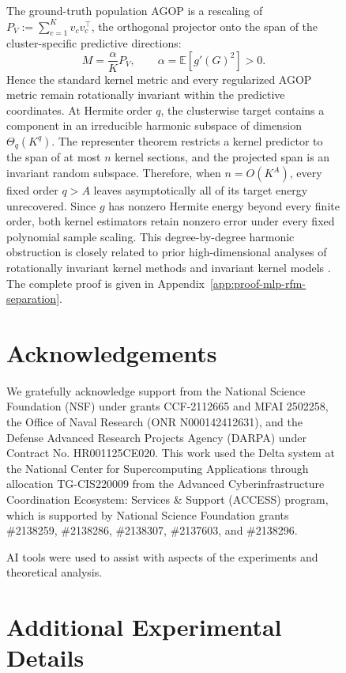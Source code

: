 \documentclass{article}
\newcounter{model}[section]
\begin{document}
\begin{figure}
The ground-truth population AGOP is a rescaling of
$P_V:=\sum_{c=1}^K v_cv_c^\top$, the orthogonal projector onto the span of
the cluster-specific predictive directions:
\[
    M=\frac{\alpha}{K}P_V,
    \qquad
    \alpha=\mathbb E[g'(G)^2]>0.
\]
Hence the standard kernel metric and every regularized AGOP metric remain
rotationally invariant within the predictive coordinates. At Hermite order
$q$, the clusterwise target contains a component in an irreducible harmonic
subspace of dimension $\Theta_q(K^q)$. The representer theorem restricts a
kernel predictor to the span of at most $n$ kernel sections, and the projected
span is an invariant random subspace. Therefore, when $n=O(K^A)$, every fixed
order $q>A$ leaves asymptotically all of its target energy unrecovered. Since
$g$ has nonzero Hermite energy beyond every finite order, both kernel
estimators retain nonzero error under every fixed polynomial sample scaling. This degree-by-degree harmonic obstruction is closely related to prior
high-dimensional analyses of rotationally invariant kernel methods and
invariant kernel models
\citep{ghorbani2021linearized,ghorbani2020outperform,mei2021invariances}.
The complete proof is given in
Appendix~\ref{app:proof-mlp-rfm-separation}.

\newpage




\section*{Acknowledgements}

We gratefully acknowledge support from the National Science Foundation (NSF)
under grants CCF-2112665 and MFAI 2502258, the Office of Naval Research
(ONR N000142412631), and the Defense Advanced Research Projects Agency
(DARPA) under Contract No. HR001125CE020.
This work used the Delta system at the National Center for Supercomputing Applications through allocation TG-CIS220009 from the Advanced Cyberinfrastructure Coordination Ecosystem: Services \& Support (ACCESS) program, which is supported by National Science Foundation grants \#2138259, \#2138286, \#2138307, \#2137603, and \#2138296.


AI tools were used to assist with aspects of the experiments and theoretical analysis.






\newpage
\appendix

\section{Additional Experimental Details}
\label{app:experimental-details}


\end{figure}
\end{document}
